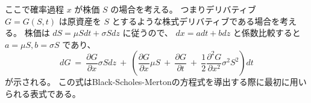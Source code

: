 \documentclass[uplatex,a4j,12pt,dvipdfmx]{jsarticle}
\begin{document}
ここで確率過程 $x$ が株価 $S$ の場合を考える。
つまりデリバティブ $G=G(S,t)$ は原資産を $S$ とするような株式デリバティブである場合を考える。
株価は $dS = \mu S dt + \sigma S dz$ に従うので、
$dx=adt+bdz$
と係数比較すると
$a= \mu S, b=\sigma S$ であり、
$$
	dG
	\ = \
	\dfrac{\partial G}{\partial x} \sigma S dz
	\ + \
	\left(
	\dfrac{\partial G}{\partial x} \mu S
	\ + \
	\dfrac{\partial G}{\partial t}
	\ + \
	\dfrac{1}{2} \dfrac{\partial^{2} G}{\partial x^{2}} \sigma^{2} S^{2}
	\right)
	dt
$$
が示される。
この式はBlack-Scholes-Mertonの方程式を導出する際に最初に用いられる表式である。
\end{document}
